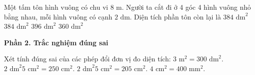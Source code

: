 \begin{ex} %
Một tấm tôn hình vuông có chu vi $8\text{ m}$. Người ta cắt đi ở 4 góc 4 hình vuông nhỏ bằng nhau, mỗi hình vuông có cạnh $2\text{ dm}$. Diện tích phần tôn còn lại là
\choice
{\True $384\text{ dm}^2$}
{$384\text{ dm}^2$}
{$396\text{ dm}^2$}
{$360\text{ dm}^2$}
\end{ex}

\textbf{Phần 2. Trắc nghiệm đúng sai}

\begin{ex} %
Xét tính đúng sai của các phép đổi đơn vị đo diện tích:
\choiceTF
{\True $3\text{ m}^2 = 300\text{ dm}^2$.}
{$2\text{ dm}^2 5\text{ cm}^2 = 250\text{ cm}^2$.}
{\True $2\text{ dm}^2 5\text{ cm}^2 = 205\text{ cm}^2$.}
{\True $4\text{ cm}^2 = 400\text{ mm}^2$.}
\end{ex}

